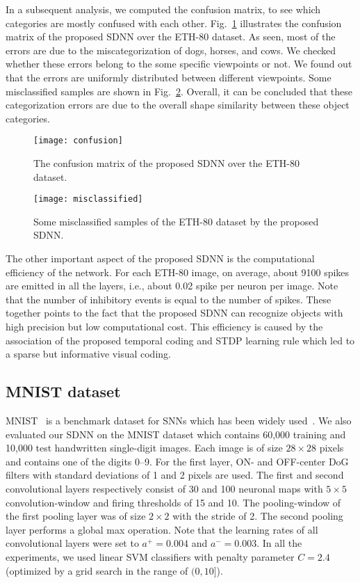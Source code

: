 \documentclass[preprint,5p,12pt,twocolumn]{article}
\begin{document}
In a subsequent analysis, we computed the confusion matrix, to see which categories are mostly confused with each other. Fig.~\ref{figure4} illustrates the confusion matrix of the proposed SDNN over the ETH-80 dataset. As seen, most of the errors are due to the miscategorization of dogs, horses, and cows. We checked whether these errors belong to the some specific viewpoints or not. We found out that the errors are uniformly distributed between different viewpoints. Some misclassified samples are shown in Fig.~\ref{figure4_2}. Overall, it can be concluded that these categorization errors are due to the overall shape similarity between these object categories.

\begin{figure}[!t]
\centering
\texttt{[image: confusion]}
\caption{ The confusion matrix of the proposed SDNN over the ETH-80 dataset.}
\label{figure4}
\end{figure}

\begin{figure}[!t]
\centering
\texttt{[image: misclassified]}
\caption{ Some misclassified samples of the ETH-80 dataset by the proposed SDNN.}
\label{figure4_2}
\end{figure}

The other important aspect of the proposed SDNN is the computational efficiency of the network. For each ETH-80 image, on average, about 9100 spikes are emitted in all the layers, i.e., about 0.02 spike per neuron per image. Note that the number of inhibitory events is equal to the number of spikes. These together points to the fact that the proposed SDNN can recognize objects with high precision but low computational cost. This efficiency is caused by the association of the proposed temporal coding and STDP learning rule which led to a sparse but informative visual coding.

\subsection*{MNIST dataset}
MNIST~\cite{lecun1998gradient} is a benchmark dataset for SNNs which has been widely used~\cite{hussain2014improved,zhao2015feedforward,querlioz2013immunity,o2015real,diehl2015unsupervised,diehl2015fast}. We also evaluated our SDNN on the MNIST dataset which contains 60,000 training and 10,000 test handwritten single-digit images.  Each image is of size $28 \times 28$ pixels and contains one of the digits 0--9. For the first layer, ON- and OFF-center DoG filters with standard deviations of 1 and 2 pixels are used. The first and second convolutional layers respectively consist of 30 and 100 neuronal maps with $5 \times 5$ convolution-window and firing thresholds of 15 and 10. The pooling-window of the first pooling layer was of size $2 \times 2$ with the stride of 2. The second pooling layer performs a global max operation. Note that the learning rates of all convolutional layers were set to $a^{+}=0.004$ and $a^{-}=0.003$. In all the experiments, we used linear SVM classifiers with penalty parameter $C=2.4$ (optimized by a grid search in the range of $(0,10]$).
\end{document}
